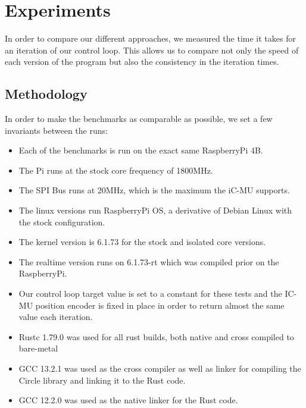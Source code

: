 \chapter{Experiments}
\label{chap:experiments}

In order to compare our different approaches, we measured the time it takes for an iteration of our control loop.
This allows us to compare not only the speed of each version of the program but also the consistency in the iteration times.

\section{Methodology}
\label{sec:experiments:methodology}

In order to make the benchmarks as comparable as possible, we set a few invariants between the runs:
\begin{itemize}
  \item Each of the benchmarks is run on the exact same RaspberryPi 4B.
  \item The Pi runs at the stock core frequency of 1800MHz.
  \item The SPI Bus runs at 20MHz, which is the maximum the iC-MU supports.
  \item The linux versions run RaspberryPi OS, a derivative of Debian Linux with the stock configuration.
  \item The kernel version is 6.1.73 for the stock and isolated core versions.
  \item The realtime version runs on 6.1.73-rt which was compiled prior on the RaspberryPi.
  \item Our control loop target value is set to a constant for these tests and the IC-MU position encoder is fixed in place in order to return almost the same value each iteration.
  \item Rustc 1.79.0 was used for all rust builds, both native and cross compiled to bare-metal
  \item GCC 13.2.1 was used as the cross compiler as well as linker for compiling the Circle library and linking it to the Rust code.
  \item GCC 12.2.0 was used as the native linker for the Rust code.
\end{itemize}

